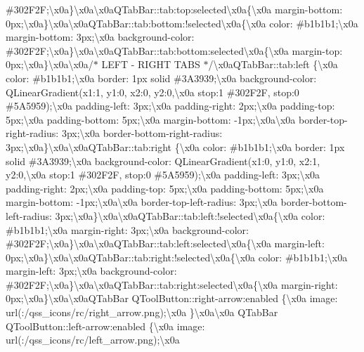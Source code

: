 \begin{DoxyCompactItemize}
\#302\+F2\+F;\textbackslash{}x0a\}\textbackslash{}x0a\textbackslash{}x0a\+Q\+Tab\+Bar\+::tab\+:top\+:selected\textbackslash{}x0a\{\textbackslash{}x0a margin-\/bottom\+: 0px;\textbackslash{}x0a\}\textbackslash{}x0a\textbackslash{}x0a\+Q\+Tab\+Bar\+::tab\+:bottom\+:!selected\textbackslash{}x0a\{\textbackslash{}x0a color\+: \#b1b1b1;\textbackslash{}x0a margin-\/bottom\+: 3px;\textbackslash{}x0a background-\/color\+: \#302\+F2\+F;\textbackslash{}x0a\}\textbackslash{}x0a\textbackslash{}x0a\+Q\+Tab\+Bar\+::tab\+:bottom\+:selected\textbackslash{}x0a\{\textbackslash{}x0a margin-\/top\+: 0px;\textbackslash{}x0a\}\textbackslash{}x0a\textbackslash{}x0a/$\ast$ L\+E\+F\+T -\/ R\+I\+G\+H\+T T\+A\+B\+S $\ast$/\textbackslash{}x0a\+Q\+Tab\+Bar\+::tab\+:left \{\textbackslash{}x0a color\+: \#b1b1b1;\textbackslash{}x0a border\+: 1px solid \#3\+A3939;\textbackslash{}x0a background-\/color\+: Q\+Linear\+Gradient(x1\+:1, y1\+:0, x2\+:0, y2\+:0,\textbackslash{}x0a stop\+:1 \#302\+F2\+F, stop\+:0 \#5\+A5959);\textbackslash{}x0a padding-\/left\+: 3px;\textbackslash{}x0a padding-\/right\+: 2px;\textbackslash{}x0a padding-\/top\+: 5px;\textbackslash{}x0a padding-\/bottom\+: 5px;\textbackslash{}x0a margin-\/bottom\+: -\/1px;\textbackslash{}x0a\textbackslash{}x0a border-\/top-\/right-\/radius\+: 3px;\textbackslash{}x0a border-\/bottom-\/right-\/radius\+: 3px;\textbackslash{}x0a\}\textbackslash{}x0a\textbackslash{}x0a\+Q\+Tab\+Bar\+::tab\+:right \{\textbackslash{}x0a color\+: \#b1b1b1;\textbackslash{}x0a border\+: 1px solid \#3\+A3939;\textbackslash{}x0a background-\/color\+: Q\+Linear\+Gradient(x1\+:0, y1\+:0, x2\+:1, y2\+:0,\textbackslash{}x0a stop\+:1 \#302\+F2\+F, stop\+:0 \#5\+A5959);\textbackslash{}x0a padding-\/left\+: 3px;\textbackslash{}x0a padding-\/right\+: 2px;\textbackslash{}x0a padding-\/top\+: 5px;\textbackslash{}x0a padding-\/bottom\+: 5px;\textbackslash{}x0a margin-\/bottom\+: -\/1px;\textbackslash{}x0a\textbackslash{}x0a border-\/top-\/left-\/radius\+: 3px;\textbackslash{}x0a border-\/bottom-\/left-\/radius\+: 3px;\textbackslash{}x0a\}\textbackslash{}x0a\textbackslash{}x0a\+Q\+Tab\+Bar\+::tab\+:left\+:!selected\textbackslash{}x0a\{\textbackslash{}x0a color\+: \#b1b1b1;\textbackslash{}x0a margin-\/right\+: 3px;\textbackslash{}x0a background-\/color\+: \#302\+F2\+F;\textbackslash{}x0a\}\textbackslash{}x0a\textbackslash{}x0a\+Q\+Tab\+Bar\+::tab\+:left\+:selected\textbackslash{}x0a\{\textbackslash{}x0a margin-\/left\+: 0px;\textbackslash{}x0a\}\textbackslash{}x0a\textbackslash{}x0a\+Q\+Tab\+Bar\+::tab\+:right\+:!selected\textbackslash{}x0a\{\textbackslash{}x0a color\+: \#b1b1b1;\textbackslash{}x0a margin-\/left\+: 3px;\textbackslash{}x0a background-\/color\+: \#302\+F2\+F;\textbackslash{}x0a\}\textbackslash{}x0a\textbackslash{}x0a\+Q\+Tab\+Bar\+::tab\+:right\+:selected\textbackslash{}x0a\{\textbackslash{}x0a margin-\/right\+: 0px;\textbackslash{}x0a\}\textbackslash{}x0a\textbackslash{}x0a\+Q\+Tab\+Bar Q\+Tool\+Button\+::right-\/arrow\+:enabled \{\textbackslash{}x0a image\+: url(\+:/qss\+\_\+icons/rc/right\+\_\+arrow.\+png);\textbackslash{}x0a \}\textbackslash{}x0a\textbackslash{}x0a Q\+Tab\+Bar Q\+Tool\+Button\+::left-\/arrow\+:enabled \{\textbackslash{}x0a image\+: url(\+:/qss\+\_\+icons/rc/left\+\_\+arrow.\+png);\textbackslash{}x0a 
\end{DoxyCompactItemize}
